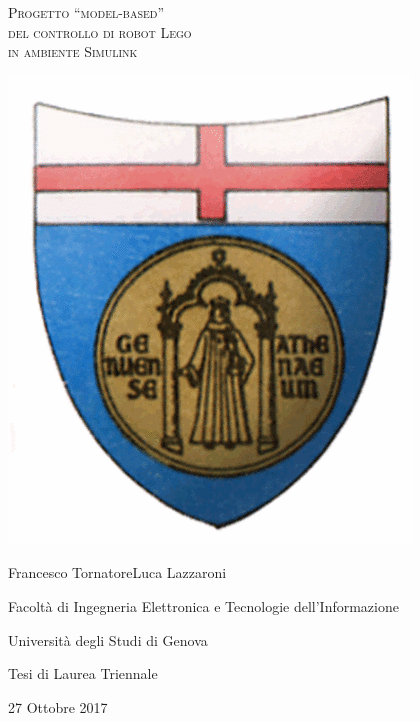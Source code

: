 \documentclass[11pt]{book}
\begin{document}
\begin{titlepage}
\thispagestyle{empty}
\centering
\begin{center}
	\begin{Huge}
		\textsc{Progetto ``model-based''\\
			del controllo di robot Lego\\
			in ambiente Simulink\\}
	\end{Huge}
\end{center}
\vfill
\vfill
\vfill
\begin{center}
	\includegraphics[scale=0.35]{logo_unige.png}
\end{center}
\vfill
\vfill
\vfill
\begin{center}
	{\LARGE Francesco Tornatore\quad Luca Lazzaroni}
\end{center}
\vfill
\begin{center}
	{\Large Facoltà di Ingegneria Elettronica e Tecnologie dell'Informazione}
\end{center}
\begin{center}
	{\Large Università degli Studi di Genova}	
\end{center}
\vfill

\begin{center}
	{\large Tesi di Laurea Triennale}
\end{center}
\begin{center}
	{\large 27 Ottobre 2017}
\end{center}
\vfill
\end{titlepage}
\end{document}
